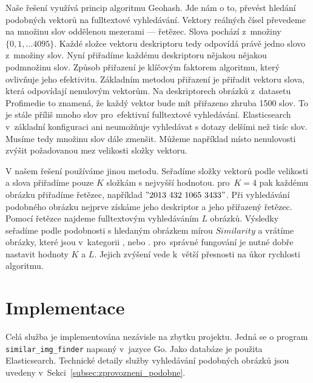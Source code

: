 Naše řešení využívá princip algoritmu Geohash. Jde nám o to, převést hledání podobných vektorů na fulltextové vyhledávání. Vektory reálných čísel převedeme na množinu slov oddělenou mezerami --- řetězec. Slova pochází z~množiny $\{0, 1,… 4095\}$. Každé složce vektoru deskriptoru tedy odpovídá právě jedno slovo z~množiny slov. Nyní přiřadíme každému deskriptoru nějakou nějakou podmnožinu slov. Způsob přiřazení je klíčovým faktorem algoritmu, který ovlivňuje jeho efektivitu. Základním metodou přiřazení je přiřadit vektoru slova, která odpovídají nenulovým vektorům. Na deskriptorech obrázků z~datasetu Profimedie to znamená, že každý vektor bude mít přiřazeno zhruba 1500 slov. To je stále příliš mnoho slov pro~efektivní fulltextové vyhledávání. Elasticsearch v~základní konfiguraci ani neumožňuje vyhledávat s dotazy delšími než tisíc slov. Musíme tedy množinu slov dále zmenšit. Můžeme například místo nenulovosti zvýšit požadovanou mez velikosti složky vektoru.

V našem řešení používáme jinou metodu. Seřadíme složky vektorů podle velikosti a slova přiřadíme pouze $K$ složkám s nejvyšší hodnotou. pro~$K = 4$ pak každému obrázku přiřadíme řetězec, například $\mathrm{"}2013\ 432\ 1065\ 3433\mathrm{"}$. Při vyhledávání podobného obrázku nejprve získáme jeho deskriptor a jeho přiřazený řetězec. Pomocí řetězce najdeme fulltextovým vyhledáváním $L$ obrázků. Výsledky seřadíme podle podobnosti s hledaným obrázkem mírou $Similarity$ a vrátíme obrázky, které jsou v~kategorii , nebo . pro~správné fungování je nutné dobře nastavit hodnoty $K$ a $L$. Jejich zvýšení vede k~větší přesnosti na úkor rychlosti algoritmu.

\section{Implementace}

Celá služba je implementována nezávisle na zbytku projektu. Jedná se o program \lstinline{similar_img_finder} napsaný v~jazyce Go. Jako databáze je použita Elasticsearch. Technické detaily služby vyhledávání podobných obrázků jsou uvedeny v~Sekci~\ref{subsec:zprovozneni_podobne}.





